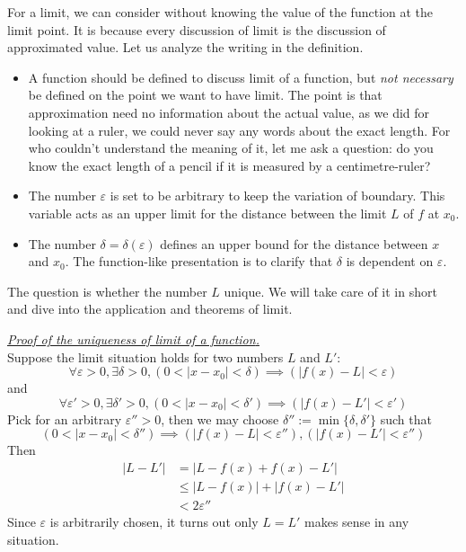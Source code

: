 \documentclass[12pt]{article}
\renewenvironment{proof}[1][Proof]{\begin{snugshade*} \underline{\textit{{#1}.}}\\}{\hfill \qedsymbol \end{snugshade*}}
\begin{document}
    For a limit, we can consider without knowing the value of the function at the limit point. It is because every discussion of limit is the discussion of approximated value. Let us analyze the writing in the definition.\begin{itemize}
        \item A function should be defined to discuss limit of a function, but \textit{not necessary} be defined on the point we want to have limit. The point is that approximation need no information about the actual value, as we did for looking at a ruler, we could never say any words about the exact length. For who couldn't understand the meaning of it, let me ask a question: do you know the exact length of a pencil if it is measured by a centimetre-ruler?
        \item The number $\varepsilon$ is set to be arbitrary to keep the variation of boundary. This variable acts as an upper limit for the distance between the limit $L$ of $f$ at $x_0$.
        \item The number $\delta=\delta(\varepsilon)$ defines an upper bound for the distance between $x$ and $x_0$. The function-like presentation is to clarify that $\delta$ is dependent on $\varepsilon$.
    \end{itemize}

    The question is whether the number $L$ unique. We will take care of it in short and dive into the application and theorems of limit.

    \begin{proof}[Proof of the uniqueness of limit of a function]
        Suppose the limit situation holds for two numbers $L$ and $L'$: \[\forall \varepsilon > 0, \exists \delta > 0, (0<|x-x_0|<\delta)\implies (|f(x)-L|<\varepsilon)\] and \[\forall \varepsilon' > 0, \exists \delta' > 0, (0<|x-x_0|<\delta')\implies (|f(x)-L'|<\varepsilon')\]
        Pick for an arbitrary $\varepsilon''>0$, then we may choose $\delta'':=\min\{\delta,\delta'\}$ such that \[(0<|x-x_0|<\delta'')\implies (|f(x)-L|<\varepsilon''), (|f(x)-L'|<\varepsilon'')\]
        Then \begin{align*}
            |L-L'|&=|L-f(x)+f(x)-L'|\\
            &\leq |L-f(x)|+|f(x)-L'|\\
            &<2\varepsilon''
        \end{align*}
        Since $\varepsilon$ is arbitrarily chosen, it turns out only $L=L'$ makes sense in any situation.
    \end{proof}
\end{document}
